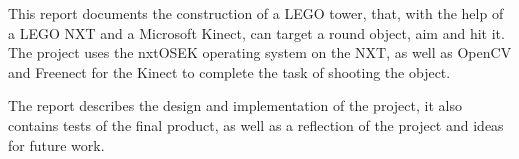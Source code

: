 This report documents the construction of a LEGO tower, that, with the help of a LEGO NXT and a Microsoft Kinect, can target a round object, aim and hit it. The project uses the nxtOSEK operating system on the NXT, as well as OpenCV and Freenect for the Kinect to complete the task of shooting the object.

The report describes the design and implementation of the project, it also contains tests of the final product, as well as a reflection of the project and ideas for future work.